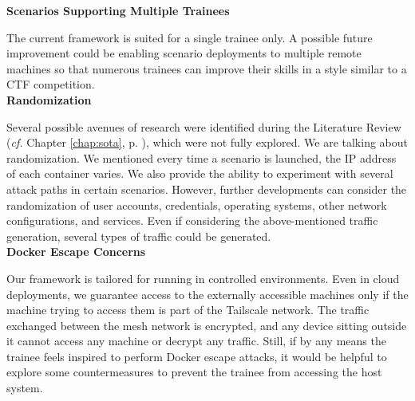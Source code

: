 \textbf{Scenarios Supporting Multiple Trainees}

The current framework is suited for a single trainee only. A possible future improvement could be enabling scenario deployments to multiple remote machines so that numerous trainees can improve their skills in a style similar to a CTF competition.\\

\textbf{Randomization}

Several possible avenues of research were identified during the Literature Review (\textit{cf.} Chapter \ref{chap:sota}, p. \pageref{chap:sota}), which were not fully explored. We are talking about randomization. We mentioned every time a scenario is launched, the IP address of each container varies. We also provide the ability to experiment with several attack paths in certain scenarios. However, further developments can consider the randomization of user accounts, credentials, operating systems, other network configurations, and services. Even if considering the above-mentioned traffic generation, several types of traffic could be generated.\\

\textbf{Docker Escape Concerns}

Our framework is tailored for running in controlled environments. Even in cloud deployments, we guarantee access to the externally accessible machines only if the machine trying to access them is part of the Tailscale network. The traffic exchanged between the mesh network is encrypted, and any device sitting outside it cannot access any machine or decrypt any traffic. Still, if by any means the trainee feels inspired to perform Docker escape attacks, it would be helpful to explore some countermeasures to prevent the trainee from accessing the host system.\\
